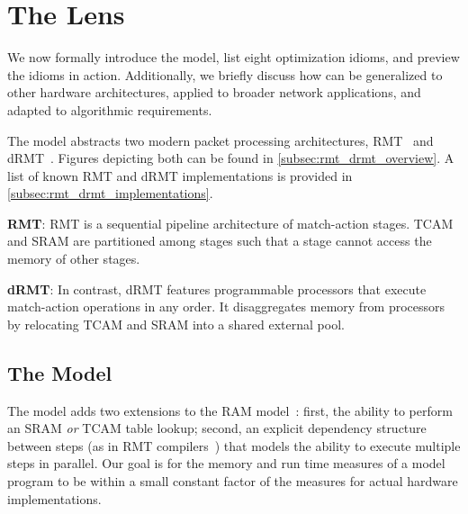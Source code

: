 \newcommand*\BitAnd{\mathbin{\&}}
\newcommand*\BitOr{\mathbin{|}}
\newcommand*\BitXor{\mathbin{\hat{}}}
\newcommand*\ShiftLeft{<<}
\newcommand*\ShiftRight{>>}
\newcommand*\BitNeg{\ensuremath{\mathord{\sim}}}


\section{The \cram Lens}
\label{sec:cram}

We now formally introduce the \cram model, list eight optimization idioms, and preview the idioms in action. Additionally, we briefly discuss how \cram can be generalized to other hardware architectures, applied to broader network applications, and adapted to algorithmic requirements.

The \cram model abstracts two modern packet processing architectures, RMT~\cite{rmt} and dRMT~\cite{drmt}. Figures depicting both can be found in \cref{subsec:rmt_drmt_overview}. A list of known RMT and dRMT implementations is provided in \cref{subsec:rmt_drmt_implementations}.

{\bf RMT}: RMT is a sequential pipeline architecture of match-action stages. TCAM and SRAM are partitioned among stages such that a stage cannot access the memory of other stages.

{\bf dRMT}: In contrast, dRMT features programmable processors that execute match-action operations in any order. It disaggregates memory from processors by relocating TCAM and SRAM into a shared external pool.

\subsection{The \cram Model} \label{subsec:cram_model}

The \cram model adds two extensions to the RAM model~\cite{ram}: first, the ability to perform an SRAM {\em or} TCAM table lookup; second, an explicit dependency structure between steps (as in RMT compilers~\cite{rmt_compilers}) that models the ability to execute multiple steps in parallel. Our goal is for the memory and run time measures of a \cram model program to be within a small constant factor of the measures for actual hardware implementations.

